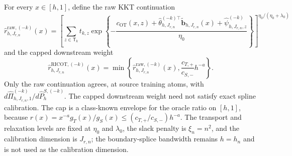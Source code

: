 For every \(x\in[h,1]\), define the raw KKT continuation
\[
\widehat r^{\mathrm{raw},(-k)}_{h,J_{r,n}}(x)=
\left[\sum_{z\in\mathsf T_k}t_{k,z}\exp\left\{-\frac{c_{\mathrm{OT}}(x,z)+\widehat\theta_{h,J_{r,n}}^{(-k)\top}\widetilde{\mathbf b}_{h,J_{r,n}}(x)+\widehat\psi^{(-k)}_{h,J_{r,n},z}}{\eta_0}\right\}\right]^{\eta_0/(\eta_0+\lambda_0)}
\]
and the capped downstream weight
\[
\widehat r^{\mathrm{RICOT},(-k)}_{h,J_{r,n}}(x)=
\min\left\{\widehat r^{\mathrm{raw},(-k)}_{h,J_{r,n}}(x),\frac{c_{T,+}}{c_{S,-}}h^{-a}\right\}.
\]
Only the raw continuation agrees, at source training atoms, with \(d\widehat\Pi^{(-k)}_{h,J_{r,n},1}/d\widehat P^{S,(-k)}_h\). The capped downstream weight need not satisfy exact spline calibration. The cap is a class-known envelope for the oracle ratio on \([h,1]\), because \(r(x)=x^{-a}g_T(x)/g_S(x)\le(c_{T,+}/c_{S,-})h^{-a}\). The transport and relaxation levels are fixed at \(\eta_0\) and \(\lambda_0\), the slack penalty is \(\xi_n=n^2\), and the calibration dimension is \(J_{r,n}\); the boundary-splice bandwidth remains \(h=h_n\) and is not used as the calibration dimension.